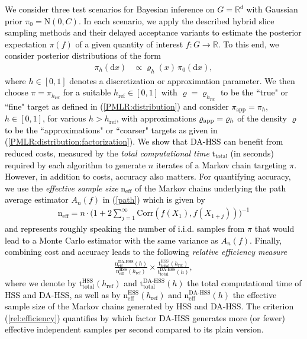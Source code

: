 \documentclass[sn-mathphys-num]{sn-jnl}%
\theoremstyle{thmstyleone}%
\theoremstyle{thmstyletwo}%
\theoremstyle{thmstylethree}%
\newcommand{\rhoapp}{\varrho_{{\rm app}}}
\newcommand{\piapp}{\pi_{\text{app}}}
\newcommand{\rev}[1]{\textcolor{black}{#1}}
\newcommand{\change}[1]{\bgroup\color{black}#1\egroup}    %
\begin{document}
\rev{We consider \change{three} test scenarios for Bayesian inference on $G = \mathbb R^d$ with Gaussian prior $\pi_0=\mathrm{N}(0,C)$. In each scenario, we apply the described hybrid slice sampling methods and their delayed acceptance variants to estimate the posterior expectation $\pi(f)$ of a given quantity of interest $f\colon G \to \mathbb R$. To this end, we consider posterior distributions of the form
\begin{align}\label{num:exp:posterior}
	\pi_h(\text{d} x)
	& \propto
    \varrho_h(x)\, \pi_0(\mathrm{d}x),
\end{align}
where $h\in [0,1]$ denotes a discretization or approximation parameter. We then choose $\pi = \pi_{h_\text{ref}}$ for a suitable $h_\text{ref}\in[0,1]$ with $\varrho = \varrho_{h_\text{ref}}$ to be the ``true" or ``fine" target as defined in (\ref{PMLR:distribution}) and consider $\piapp=\pi_h$, $h\in[0,1]$, for various $h>h_\text{ref}$, with approximations $\rhoapp = \varrho_{h}$ of the density $\varrho$ to be the ``approximations" or ``coarser" targets as given in (\ref{PMLR:distribution:factorization}).  
We show that DA-HSS can benefit from reduced costs, measured by the \change{\emph{total computational time}} $\mathrm{t_{{total}}}$ (in seconds) required by each algorithm to generate $n$ iterates of a Markov chain targeting $\pi$. However, in addition to costs, accuracy also matters. For quantifying accuracy, we use the \change{\emph{effective sample size}} $\mathrm{n_{eff}}$ of the Markov chains underlying the path average estimator $A_n(f)$ in (\ref{path}) which is given by
\begin{align*}
  \mathrm{n_{eff}}
    = n \cdot \Bigg(1+2\sum_{j=1}^{\infty}\text{Corr}(f(X_1),f(X_{1+j}))\Bigg)^{-1}
\end{align*}
and represents roughly speaking the number of i.i.d. samples from $\pi$ that would lead to a Monte Carlo estimator with the same variance as $A_n(f)$. Finally, combining cost and accuracy leads to the following \change{\emph{relative efficiency measure}} 
\begin{align}\label{rel:efficiency}
   \frac{\mathrm{n}^{\text{DA-HSS}}_{\mathrm{eff}}(h)}{\mathrm{n}^{\text{HSS}}_{\mathrm{eff}}(h_{\text{ref}})} \times \frac{\mathrm{t}_{\mathrm{total}}^{\text{HSS}}(h_{\text{ref}})}{\mathrm{t}_{\mathrm{total}}^{\text{DA-HSS}}(h)},    
\end{align}
where we denote by $\mathrm{t}_{\mathrm{total}}^{\text{HSS}}(h_{\text{ref}})$ and $\mathrm{t}_{\mathrm{total}}^{\text{DA-HSS}}(h)$ the total computational time of HSS and DA-HSS, as well as by $\mathrm{n}^{\text{HSS}}_{\mathrm{eff}}(h_{\text{ref}})$ and $\mathrm{n}^{\text{DA-HSS}}_{\mathrm{eff}}(h)$ the effective sample size of the Markov chains generated by HSS and DA-HSS. The criterion (\ref{rel:efficiency}) quantifies by which factor DA‑HSS generates more (or fewer) effective independent samples per second compared to its plain version.
}
\end{document}
